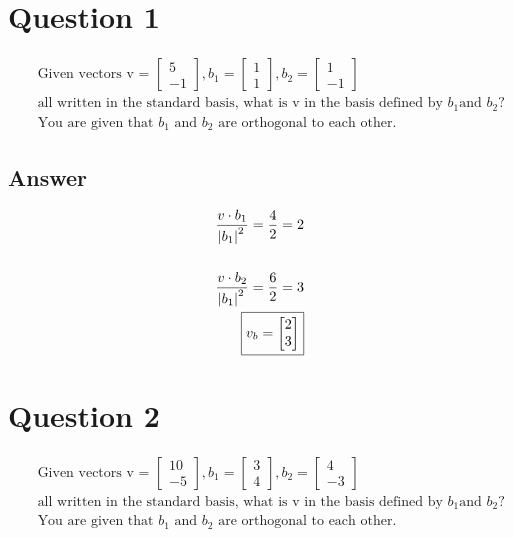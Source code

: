 \documentclass[12pt]{article}
\begin{document}
    \section*{Question 1}
    \begin{eqnarray*}
        & &\text{Given vectors v = }
        \begin{bmatrix}
            5 \\ -1
        \end{bmatrix}
        , b_1 = 
        \begin{bmatrix}
            1 \\ 1
        \end{bmatrix}
        , b_2 = 
        \begin{bmatrix}
            1 \\ -1
        \end{bmatrix} \\
        & &\text{all written in the standard basis, what is v in the basis defined by } b_1 \text{and } b_2? \\
        & &\text{You are given that } b_1 \text{ and } b_2 \text{ are orthogonal to each other.}
    \end{eqnarray*}
    \subsection*{Answer}
    \begin{eqnarray*}
        \frac{v \cdot b_1}{\abs{b_1}^2} = \frac{4}{2} = 2 \\ \\
        \frac{v \cdot b_2}{\abs{b_1}^2} = \frac{6}{2} = 3 \\
        \boxed{v_b = 
        \begin{bmatrix}
            2 \\ 3
        \end{bmatrix}}
    \end{eqnarray*}

    \section*{Question 2}
    \begin{eqnarray*}
        & &\text{Given vectors v = }
        \begin{bmatrix}
            10 \\ -5
        \end{bmatrix}
        , b_1 = 
        \begin{bmatrix}
            3 \\ 4
        \end{bmatrix}
        , b_2 = 
        \begin{bmatrix}
            4 \\ -3
        \end{bmatrix} \\
        & &\text{all written in the standard basis, what is v in the basis defined by } b_1 \text{and } b_2? \\
        & &\text{You are given that } b_1 \text{ and } b_2 \text{ are orthogonal to each other.}
    \end{eqnarray*}
\end{document}
